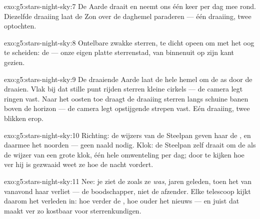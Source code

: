 \begin{solution}{exo:g5:stars-night-sky:7}
De Aarde draait en neemt ons één keer per dag mee rond. Diezelfde
draaiing laat de Zon over de daghemel paraderen --- één draaiing, twee
optochten.
\end{solution}

\begin{solution}{exo:g5:stars-night-sky:8}
Ontelbare zwakke sterren, te dicht opeen om met het oog te scheiden:
de  --- onze eigen platte sterrenstad, van binnenuit op zijn
kant gezien.
\end{solution}

\begin{solution}{exo:g5:stars-night-sky:9}
De draaiende Aarde laat de hele hemel om de as door de
 draaien. Vlak bij dat stille punt rijden sterren kleine
cirkels --- de camera legt ringen vast. Naar het oosten toe draagt de
draaiing sterren langs schuine banen boven de horizon --- de camera
legt opstijgende strepen vast. Eén draaiing, twee blikken erop.
\end{solution}

\begin{solution}{exo:g5:stars-night-sky:10}
Richting: de wijzers van de Steelpan geven haar de , en
daarmee het noorden --- geen naald nodig. Klok: de Steelpan zelf
draait om de  als de wijzer van een grote klok, één hele
omwenteling per dag; door te kijken hoe ver hij is gezwaaid weet ze
hoe de nacht vordert.
\end{solution}

\begin{solution}{exo:g5:stars-night-sky:11}
Nee: je ziet de  zoals ze \emph{was}, jaren geleden, toen het
 van vanavond haar verliet --- de boodschapper, niet de
afzender. Elke telescoop kijkt daarom het verleden in: hoe verder de
, hoe ouder het nieuws --- en juist dat maakt ver  zo
kostbaar voor sterrenkundigen.
\end{solution}
